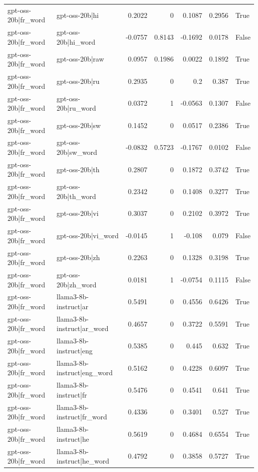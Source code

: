 \begin{table}
\begin{tabular}{l l r r r r l}
gpt-oss-20b|fr_word & gpt-oss-20b|hi & 0.2022 & 0 & 0.1087 & 0.2956 & True \\
gpt-oss-20b|fr_word & gpt-oss-20b|hi_word & -0.0757 & 0.8143 & -0.1692 & 0.0178 & False \\
gpt-oss-20b|fr_word & gpt-oss-20b|raw & 0.0957 & 0.1986 & 0.0022 & 0.1892 & True \\
gpt-oss-20b|fr_word & gpt-oss-20b|ru & 0.2935 & 0 & 0.2 & 0.387 & True \\
gpt-oss-20b|fr_word & gpt-oss-20b|ru_word & 0.0372 & 1 & -0.0563 & 0.1307 & False \\
gpt-oss-20b|fr_word & gpt-oss-20b|sw & 0.1452 & 0 & 0.0517 & 0.2386 & True \\
gpt-oss-20b|fr_word & gpt-oss-20b|sw_word & -0.0832 & 0.5723 & -0.1767 & 0.0102 & False \\
gpt-oss-20b|fr_word & gpt-oss-20b|th & 0.2807 & 0 & 0.1872 & 0.3742 & True \\
gpt-oss-20b|fr_word & gpt-oss-20b|th_word & 0.2342 & 0 & 0.1408 & 0.3277 & True \\
gpt-oss-20b|fr_word & gpt-oss-20b|vi & 0.3037 & 0 & 0.2102 & 0.3972 & True \\
gpt-oss-20b|fr_word & gpt-oss-20b|vi_word & -0.0145 & 1 & -0.108 & 0.079 & False \\
gpt-oss-20b|fr_word & gpt-oss-20b|zh & 0.2263 & 0 & 0.1328 & 0.3198 & True \\
gpt-oss-20b|fr_word & gpt-oss-20b|zh_word & 0.0181 & 1 & -0.0754 & 0.1115 & False \\
gpt-oss-20b|fr_word & llama3-8b-instruct|ar & 0.5491 & 0 & 0.4556 & 0.6426 & True \\
gpt-oss-20b|fr_word & llama3-8b-instruct|ar_word & 0.4657 & 0 & 0.3722 & 0.5591 & True \\
gpt-oss-20b|fr_word & llama3-8b-instruct|eng & 0.5385 & 0 & 0.445 & 0.632 & True \\
gpt-oss-20b|fr_word & llama3-8b-instruct|eng_word & 0.5162 & 0 & 0.4228 & 0.6097 & True \\
gpt-oss-20b|fr_word & llama3-8b-instruct|fr & 0.5476 & 0 & 0.4541 & 0.641 & True \\
gpt-oss-20b|fr_word & llama3-8b-instruct|fr_word & 0.4336 & 0 & 0.3401 & 0.527 & True \\
gpt-oss-20b|fr_word & llama3-8b-instruct|he & 0.5619 & 0 & 0.4684 & 0.6554 & True \\
gpt-oss-20b|fr_word & llama3-8b-instruct|he_word & 0.4792 & 0 & 0.3858 & 0.5727 & True \\

\end{tabular}
\end{table}
